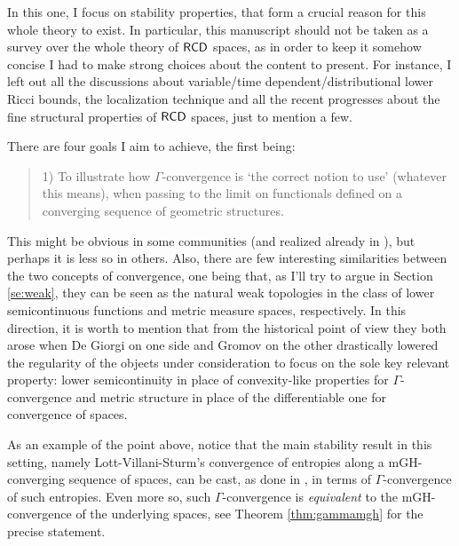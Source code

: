 \documentclass[11pt]{article}
\numberwithin{equation}{section}
\newcommand{\RCD}{{\sf RCD}}
\begin{document}
In this one, I focus on stability properties, that form a crucial reason for this whole theory to exist. In particular, this manuscript should not be taken as a survey over the whole theory of $\RCD$ spaces, as in order to keep it somehow concise  I had to make strong choices about the content to present. For instance, I left out all the discussions about variable/time dependent/distributional lower Ricci bounds, the localization technique  and all the recent  progresses about the fine structural properties of $\RCD$ spaces, just to mention a few.



There are four goals I aim to achieve, the first being:
\begin{quote}
1) To illustrate how $\Gamma$-convergence is `the correct notion to use' (whatever this means), when passing to the limit on functionals defined on a converging sequence of geometric structures.
\end{quote}
This might be obvious in some communities (and realized already in \cite{KS03conv}), but perhaps it is less so in others. Also, there are few interesting similarities between the two concepts of convergence, one being that, as I'll try to argue in Section \ref{se:weak}, they can be seen as the natural weak topologies in the class of lower semicontinuous functions and metric measure spaces, respectively. In this direction, it is worth to mention that from the historical point of view they both arose when De Giorgi on one side and Gromov on the other drastically lowered the regularity of the objects under consideration to focus on the sole key relevant property: lower semicontinuity in place of convexity-like properties for $\Gamma$-convergence and metric structure in place of the differentiable one for  convergence of spaces.

As an example of the point above, notice that the main stability result in this setting, namely Lott-Villani-Sturm's convergence of entropies along a mGH-converging sequence of spaces, can be cast, as done in \cite{Gigli10}, in terms of $\Gamma$-convergence of such entropies. Even more so, such $\Gamma$-convergence is \emph{equivalent} to the mGH-convergence of the underlying spaces, see Theorem \ref{thm:gammamgh} for the precise statement.
\end{document}
